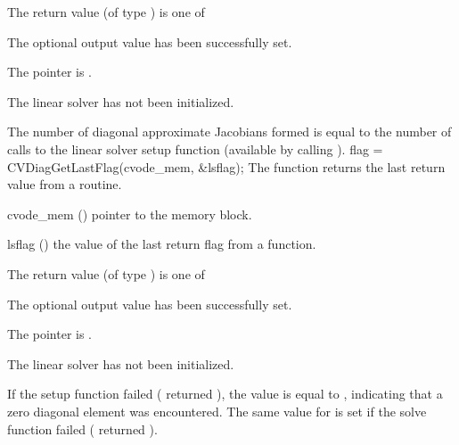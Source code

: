 {
  The return value  (of type ) is one of
  \begin{args}
  \item[\Id{CVDIAG\_SUCCESS}] 
    The optional output value has been successfully set.
  \item[\Id{CVDIAG\_MEM\_NULL}]
    The  pointer is .
  \item[\Id{CVDIAG\_LMEM\_NULL}]
    The {\cvdiag} linear solver has not been initialized.
  \end{args}
}
{
  The number of diagonal approximate Jacobians formed is
  equal to the number of calls to the linear solver setup function
  (available by calling ).
}
{
  flag = CVDiagGetLastFlag(cvode\_mem, \&lsflag);
}
{
  The function  returns the
  last return value from a {\cvdiag} routine. 
}
{
  \begin{args}
  \item[cvode\_mem] ()
    pointer to the {\cvode} memory block.
  \item[lsflag] ()
    the value of the last return flag from a {\cvdiag} function.
  \end{args}
}
{
  The return value  (of type ) is one of
  \begin{args}
  \item[\Id{CVDIAG\_SUCCESS}] 
    The optional output value has been successfully set.
  \item[\Id{CVDIAG\_MEM\_NULL}]
    The  pointer is .
  \item[\Id{CVDIAG\_LMEM\_NULL}]
    The {\cvdiag} linear solver has not been initialized.
  \end{args}
}
{
  If the {\cvdiag} setup function failed ( returned ),
  the value  is equal to , indicating that a zero
  diagonal element was encountered.
  The same value for  is set if the {\cvdiag} solve function failed
  ( returned ).
}

